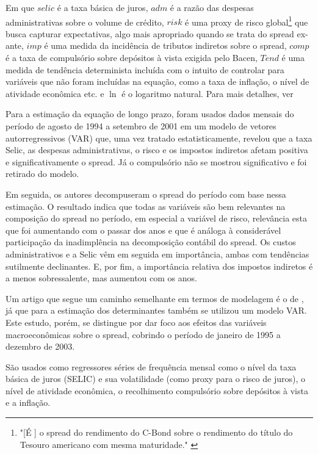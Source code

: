 \documentclass[a4paper, article, 12pt, openany, oneside, english, brazil]{abntex2}
\numberwithin{equation}{section}
\begin{document}
    Em que $selic$ é a taxa básica de juros, $adm$ é a razão das despesas administrativas sobre o volume de crédito, $risk$ é uma proxy de risco global\footnote{"[É ] o spread do rendimento do C-Bond sobre o rendimento do título do Tesouro americano com mesma maturidade." \cite[p.~10]{nakane02}} que busca capturar expectativas, algo mais apropriado quando se trata do spread ex-ante, $imp$ é uma medida da incidência de tributos indiretos sobre o spread, $comp$ é a taxa de compulsório sobre depósitos à vista exigida pelo Bacen,  $Tend$ é uma medida de tendência determinista incluída com o intuito de controlar para variáveis que não foram incluídas na equação, como a taxa de inflação, o nível de atividade econômica etc. e $\ln$ é o logaritmo natural.  Para mais detalhes, ver 

    Para a estimação da equação de longo prazo, foram usados dados mensais do período de agosto de 1994 a setembro de 2001 em um modelo de vetores autorregressivos (VAR) que, uma vez tratado estatisticamente, revelou que a taxa Selic, as despesas administrativas, o risco e os impostos indiretos afetam positiva e significativamente o spread. Já o compulsório não se mostrou significativo e foi retirado do modelo.

    Em seguida, os autores decompuseram o spread do período com base nessa estimação. O resultado indica que todas as variáveis são bem relevantes na composição do spread no período, em especial a variável de risco, relevância esta que foi aumentando com o passar dos anos e que é análoga à considerável participação da inadimplência na decomposição contábil do spread. Os custos administrativos e a Selic vêm em seguida em importância, ambas com tendências sutilmente declinantes. E, por fim, a importância relativa dos impostos indiretos é a menos sobressalente, mas aumentou com os anos. 

    Um artigo que segue um caminho semelhante em termos de modelagem é o de , já que para a estimação dos determinantes também se utilizou um modelo VAR. Este estudo, porém, se distingue por dar foco aos efeitos das variáveis macroeconômicas sobre o spread, cobrindo o período de janeiro de 1995 a dezembro de 2003. 
    
    São usados como regressores séries de frequência mensal como o nível da taxa básica de juros (SELIC) e sua volatilidade (como proxy para o risco de juros), o nível de atividade econômica, o recolhimento compulsório sobre depósitos à vista e a inflação.
\end{document}
